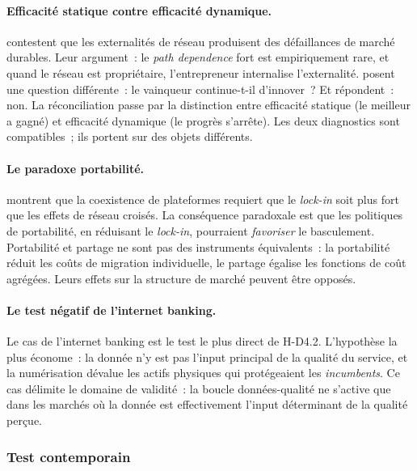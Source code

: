 \paragraph{Efficacité statique contre efficacité dynamique.}

\textcite{liebowitz_network_1994} contestent que les externalités de réseau produisent des défaillances de marché durables. Leur argument~: le \emph{path dependence} fort est empiriquement rare, et quand le réseau est propriétaire, l'entrepreneur internalise l'externalité. \textcite{pruefer_competing_2021} posent une question différente~: le vainqueur continue-t-il d'innover~? Et répondent~: non. La réconciliation passe par la distinction entre efficacité statique (le meilleur a gagné) et efficacité dynamique (le progrès s'arrête). Les deux diagnostics sont compatibles~; ils portent sur des objets différents.

\paragraph{Le paradoxe portabilité.}

\textcite{giovannetti_platform_2023} montrent que la coexistence de plateformes requiert que le \emph{lock-in} soit plus fort que les effets de réseau croisés. La conséquence paradoxale est que les politiques de portabilité, en réduisant le \emph{lock-in}, pourraient \emph{favoriser} le basculement. Portabilité et partage ne sont pas des instruments équivalents~: la portabilité réduit les coûts de migration individuelle, le partage égalise les fonctions de coût agrégées. Leurs effets sur la structure de marché peuvent être opposés.

\paragraph{Le test négatif de l'internet banking.}

Le cas de l'internet banking \parencite{lyons_digital_2024} est le test le plus direct de H-D4.2. L'hypothèse la plus économe~: la donnée n'y est pas l'input principal de la qualité du service, et la numérisation dévalue les actifs physiques qui protégeaient les \emph{incumbents}. Ce cas délimite le domaine de validité~: la boucle données-qualité ne s'active que dans les marchés où la donnée est effectivement l'input déterminant de la qualité perçue.


\subsubsection{Test contemporain}

